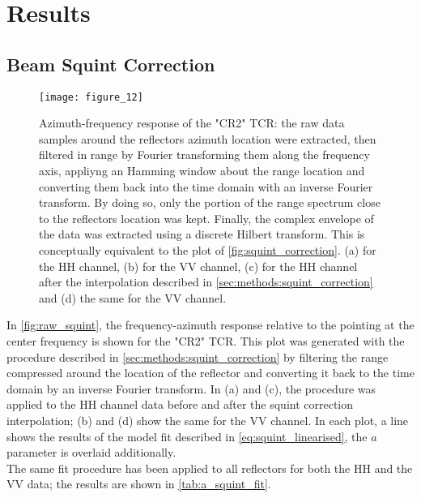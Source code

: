 \section{Results}\label{sec:results}
\subsection{Beam Squint Correction}\label{sec:results:squint_correction}
\begin{figure*}[Ht!]
	\centering
	\texttt{[image: figure\_12]}
	\caption{Azimuth-frequency response of the "CR2" TCR: the raw data samples around the reflectors azimuth location were extracted, then filtered in range by Fourier transforming them along the frequency axis, appliyng an Hamming window about the range location and converting them  back into the time domain with an inverse Fourier transform. By doing so, only the portion of the range spectrum close to the reflectors location was kept. Finally, the complex envelope of the data was extracted using a discrete Hilbert transform. This is conceptually equivalent to the plot of \autoref{fig:squint_correction}. (a) for the HH channel, (b) for the VV channel, (c) for the HH channel after the interpolation described in \autoref{sec:methods:squint_correction}  and (d) the same for the VV channel.}
	\label{fig:raw_squint}
\end{figure*}
In \autoref{fig:raw_squint}, the frequency-azimuth response relative to the pointing at the center frequency is shown for the "CR2" TCR. This plot was generated with the procedure described in \autoref{sec:methods:squint_correction} by filtering the range compressed around the location of the reflector and converting it back to the time domain by an inverse Fourier transform. In (a) and (c), the procedure was applied to the HH channel data before and after the squint correction interpolation; (b) and (d) show the same for the VV channel. In each plot, a line shows the results of the model fit described in \eqref{eq:squint_linearised}, the $a$ parameter is overlaid additionally.\\
The same fit procedure has been applied to all reflectors for both the HH and the VV data; the results are shown in \autoref{tab:a_squint_fit}.\\
